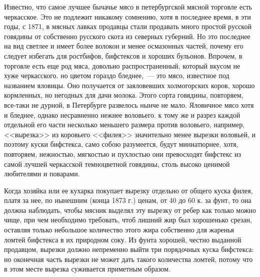 Известно, что самое лучшее бычачье мясо в петербургской мясной торговле есть черкасское. Это не подлежит никакому сомнению, хотя в последнее время, в эти годы, с 1871, в мясных лавках продавцы стали продавать много простой русской говядины от собственно русского скота из северных губерний. Но это последнее на вид светлее и имеет более волокон и менее осмазонных частей, почему его следует избегать для ростбифов, бифстексов и хороших бульонов. Впрочем, в торговле есть еще род мяса, довольно распространенный, который вкусом не хуже черкасского. но цветом гораздо бледнее,~--- это мясо, известное под названием яловицы. Оно получается от заяловевших холмогорских коров, хорошо кормленных, но негодных для дачи молока. Этого сорта говядины, повторяем, все-таки не дурной, в Петербурге развелось нынче не мало. Яловичное мясо хотя и бледнее, однако несравненно нежнее воловьего. к тому же и разрез каждой отдельной его части несколько меньшего размера против воловьего, например, <<вырезка>> из коровьего <<филея>> значительно менее вырезки воловьей, и поэтому куски бифстекса, само собою разумеется, будут миниатюрнее, хотя, повторяем, нежностью, мягкостью и пухлостью они превосходят бифстекс из самой лучшей черкасской темноцветной говядины, столь высоко ценимой любителями и поварами.

Когда хозяйка или ее кухарка покупает вырезку отдельно от общего куска филея, платя за нее, по нынешним (конца 1873 г.) ценам, от 40 до 60 к. за фунт, то она должна наблюдать, чтобы мясник выделял эту вырезку от ребер как только можно чище, при чем необходимо требовать, чтоб лишний жир был хорошенько срезан, оставляя только небольшое количество этого жира собственно для жаренья ломтей бифстекса в их природном соку. Из фунта хорошей, честно выданной продавцом, вырезки должно непременно выйти три порядочных куска бифстекса: но оконечная часть вырезки не может дать такого количества ломтей, потому что в этом месте вырезка суживается приметным образом.

